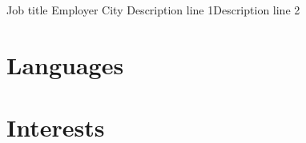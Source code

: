 \documentclass[11pt,a4paper,sans]{moderncv}
\begin{document}
{Job title}
{Employer}
{City}
{}
{Description line 1\newline{}Description line 2}

\section{Languages}

\section{Interests}
\end{document}
